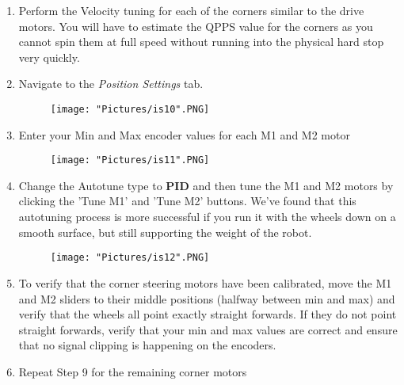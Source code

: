 \documentclass[12pt]{article}
\begin{document}
\begin{enumerate}
\begin{enumerate}
		\item Perform the Velocity tuning for each of the corners similar to the drive motors. You will have to estimate the QPPS value for the corners as you cannot spin them at full speed without running into the physical hard stop very quickly. 

		\item Navigate to the \textit{Position Settings} tab. 

		\begin{figure}[H]
	 		\centering
			\texttt{[image: "Pictures/is10".PNG]}
	 		\caption{}
		\end{figure}
		
		\item Enter your Min and Max encoder values for each M1 and M2 motor

		\begin{figure}[H]
	 		\centering
			\texttt{[image: "Pictures/is11".PNG]}
	 		\caption{}
		\end{figure}	

		\item Change the Autotune type to \textbf{PID} and then tune the M1 and M2 motors by clicking the 'Tune M1' and 'Tune M2' buttons. We've found that this autotuning process is more successful if you run it with the wheels down on a smooth surface, but still supporting the weight of the robot. 

		\begin{figure}[H]
	 		\centering
			\texttt{[image: "Pictures/is12".PNG]}
	 		\caption{}
		\end{figure}	

		\item To verify that the corner steering motors have been calibrated, move the M1 and M2 sliders to their middle positions (halfway between min and max) and verify that the wheels all point exactly straight forwards. If they do not point straight forwards, verify that your min and max values are correct and ensure that no signal clipping is happening on the encoders.

		\item Repeat Step 9 for the remaining corner motors
	\end{enumerate}

\end{enumerate} 
\end{document}
